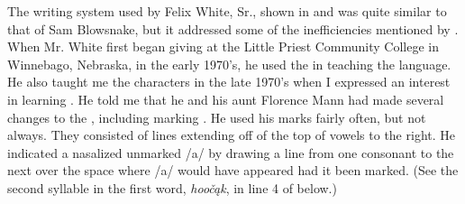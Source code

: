 \documentclass[output=paper]{LSP/langsci}
\begin{document}
The  writing system used by Felix White, Sr., shown in  and  was quite similar to that of Sam Blowsnake, but it addressed some of the inefficiencies mentioned by \citeauthor{Susman1939}. When Mr. White first began giving   at the Little Priest Community College in Winnebago, Nebraska, in the early 1970's, he used the  in teaching the language. He also taught me the  characters in the late 1970's when I expressed an interest in learning . He told me that he and his aunt Florence Mann had made several changes to the , including marking . He used his  marks fairly often, but not always. They consisted of lines extending off of the top of vowels to the right. He indicated a nasalized unmarked /a/ by drawing a line from one consonant to the next over the space where /a/ would have appeared had it been marked. (See the second syllable in the first word, \emph{hoo\v{c}\k{a}k}, in line 4 of  below.)
\end{document}
